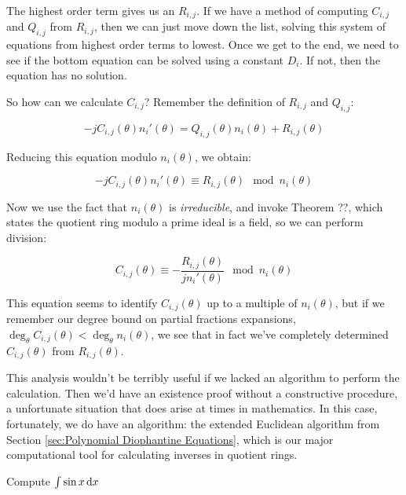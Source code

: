 The highest order term gives us an $R_{i,j}$.  If we have a method of
computing $C_{i,j}$ and $Q_{i,j}$ from $R_{i,j}$, then we can just
move down the list, solving this system of equations from highest
order terms to lowest.  Once we get to the end, we need to see if the
bottom equation can be solved using a constant $D_i$.  If not,
then the equation has no solution.

So how can we calculate $C_{i,j}$?  Remember the definition of
$R_{i,j}$ and $Q_{i,j}$:

$$-jC_{i,j}(\theta)n_i'(\theta) = Q_{i,j}(\theta) n_i(\theta) + R_{i,j}(\theta)$$

Reducing this equation modulo $n_i(\theta)$, we obtain:

$$-jC_{i,j}(\theta)n_i'(\theta) \equiv R_{i,j}(\theta) \mod n_i(\theta)$$

Now we use the fact that $n_i(\theta)$ is {\it irreducible},
and invoke Theorem ??, which states the quotient ring
modulo a prime ideal is a field, so we can perform division:

$$C_{i,j}(\theta) \equiv - \frac{R_{i,j}(\theta)}{jn_i'(\theta)} \mod n_i(\theta)$$

This equation seems to identify $C_{i,j}(\theta)$ up to a multiple of $n_i(\theta)$,
but if we remember our degree bound on partial fractions expansions,
$\deg_\theta C_{i,j}(\theta) < \deg_\theta n_i(\theta)$, we see
that in fact we've completely determined $C_{i,j}(\theta)$ from
$R_{i,j}(\theta)$.

\endtheorem

This analysis wouldn't be terribly useful if we lacked an algorithm to
perform the calculation.  Then we'd have an existence proof without a
constructive procedure, a unfortunate situation that does arise at
times in mathematics.  In this case, fortunately, we do have an
algorithm: the extended Euclidean algorithm from
Section \ref{sec:Polynomial Diophantine Equations}, which is our major
computational tool for calculating inverses in quotient rings.



\begin{comment}
$$F' = \sum_{i=-l}^n (c_i' + i c_i k' )\theta^i
  + \sum_{i=1}^\nu \sum_{j=1}^{m_i} \frac{b_{ij}'(\theta) n_i(\theta) - j b_{ij}(\theta) n_i'(\theta) }{n_i(\theta)^{j+1}}
  + \sum_{i=1}^\eta d_i \frac{n_i(\theta)'}{n_i(\theta)}$$
\end{comment}

\vfil\eject

\example Compute $\int \sin x \, {\rm d}x$

